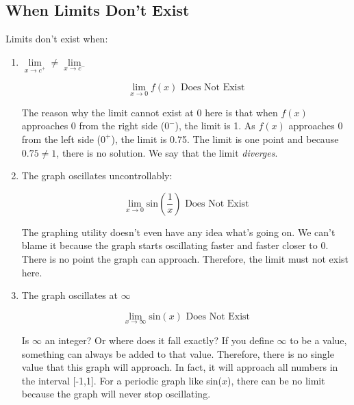\documentclass[../main.tex]{subfiles}
\begin{document}
\subsection{When Limits Don't Exist} Limits don't exist when:
\begin{enumerate}
\item $\lim\limits_{x\to c^+} \neq \lim\limits_{x\to c^-}$
\begin{center}
$$\lim_{x\to 0} f(x) \text{ Does Not Exist}$$
\end{center} 
\par The reason why the limit cannot exist at 0 here is that when $f(x)$ approaches 0 from the right side ($0^-$), the limit is 1. As $f(x)$ approaches 0 from the left side ($0^+$), the limit is 0.75. The limit is one point and because $0.75\neq 1$, there is no solution. We say that the limit \textit{diverges}.
\newpage
\item The graph oscillates uncontrollably:
\begin{center}
$$\lim_{x\to 0} \text{sin} \left ( \frac{1}{x} \right ) \text{ Does Not Exist}$$
\end{center} \par The graphing utility doesn't even have any idea what's going on. We can't blame it because the graph starts oscillating faster and faster closer to 0. There is no point the graph can approach. Therefore, the limit must not exist here.
\newpage
\item The graph oscillates at $\infty$
\begin{center}
$$\lim_{x\to\infty} \text{sin}(x) \text{ Does Not Exist}$$
\end{center}
\par Is $\infty$ an integer? Or where does it fall exactly? If you define $\infty$ to be a value, something can always be added to that value. Therefore, there is no single value that this graph will approach. In fact, it will approach all numbers in the interval [-1,1]. For a periodic graph like sin($x$), there can be no limit because the graph will never stop oscillating.
\end{enumerate}
\end{document}
